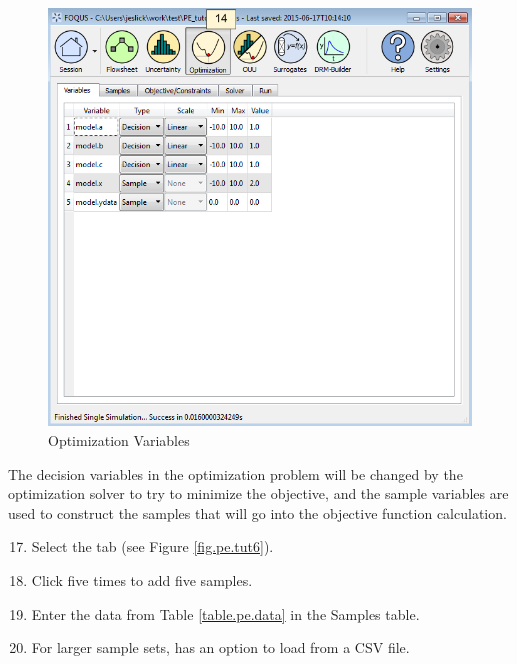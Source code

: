 \begin{figure}[H]
	\begin{center}
		\includegraphics[scale=0.55]{Chapt_optimization/figs/par_est_tut5}
		\caption{Optimization Variables}
		\label{fig.pe.tut5}
	\end{center}
\end{figure}

The decision variables in the optimization problem will be changed by the optimization solver to try to minimize the objective, and the sample variables are used to construct the samples that will go into the objective function calculation.
\begin{enumerate}
	\setcounter{enumi}{16}
	\item Select the  tab (see Figure \ref{fig.pe.tut6}).
	\item Click  five times to add five samples.
	\item Enter the data from Table \ref{table.pe.data} in the Samples table.
	\item For larger sample sets,  has an option to load from a CSV file.
\end{enumerate}

